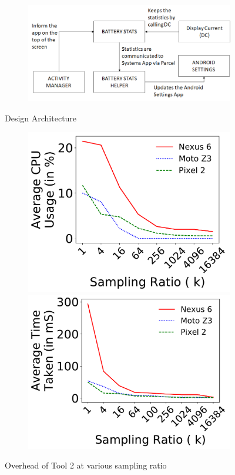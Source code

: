\begin{figure}[h]
	\begin{subfigure}[]{\columnwidth}
		\includegraphics[width=\columnwidth]{./figure/512_arch.png}
	\end{subfigure}
        \vspace{-0.1in}
	\caption{Design Architecture}
	\label{fig:tool2_arch}
\end{figure}

\begin{figure}[h]
	\begin{subfigure}[]{\columnwidth}
		\includegraphics[width=0.48\columnwidth]{./figure/511c_All_overhead.pdf}
 		\includegraphics[width=0.48\columnwidth]{./figure/511b_All_time.pdf}
	\end{subfigure}
        \vspace{-0.1in}
	\caption{Overhead of Tool 2 at various sampling ratio}
	\label{fig:tool2_overhead}
\end{figure}
\fi


